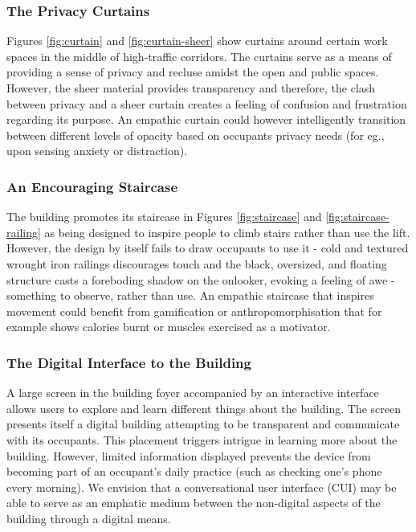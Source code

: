 \documentclass[manuscript, anonymous, review]{acmart}
\begin{document}
\subsubsection*{The Privacy Curtains}
Figures \ref{fig:curtain} and \ref{fig:curtain-sheer} show curtains around certain work spaces in the middle of high-traffic corridors. The curtains serve as a means of providing a sense of privacy and recluse amidst the open and public spaces. However, the sheer material provides transparency and therefore, the clash between privacy and a sheer curtain creates a feeling of confusion and frustration regarding its purpose. An empathic curtain could however intelligently transition between different levels of opacity based on occupants privacy needs (for eg., upon sensing anxiety or distraction).  

\subsubsection*{An Encouraging Staircase}
The building promotes its staircase in Figures \ref{fig:staircase} and \ref{fig:staircase-railing} as being designed to inspire people to climb stairs rather than use the lift. However, the design by itself fails to draw occupants to use it - cold and textured wrought iron railings discourages touch and the black, oversized, and floating structure casts a foreboding  shadow on the onlooker,  evoking a feeling of awe - something to observe, rather than use. An empathic staircase that inspires movement could benefit from gamification or anthropomorphisation that for example shows calories burnt or muscles exercised as a motivator. 

\subsubsection*{The Digital Interface to the Building}
A large screen in the building foyer accompanied by an interactive interface allows users to explore and learn different things about the building. The screen presents itself a digital building attempting to be transparent and communicate with its occupants. This placement triggers intrigue in learning more about the building. However, limited information displayed prevents the device from becoming part of an occupant's daily practice (such as checking one's phone every morning). We envision that a conversational user interface (CUI) may be able to serve as an emphatic medium between the non-digital aspects of the building through a digital means. 
\end{document}

